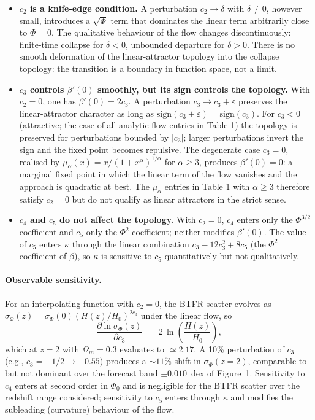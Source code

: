 \begin{itemize}
\item \textbf{$c_2$ is a knife-edge condition.} A perturbation $c_2 \to
\delta$ with $\delta \neq 0$, however small, introduces a $\sqrt{\Phi}$
term that dominates the linear term arbitrarily close to $\Phi = 0$. The
qualitative behaviour of the flow changes discontinuously: finite-time
collapse for $\delta < 0$, unbounded departure for $\delta > 0$. There is
no smooth deformation of the linear-attractor topology into the collapse
topology: the transition is a boundary in function space, not a limit.

\item \textbf{$c_3$ controls $\beta'(0)$ smoothly, but its sign controls
the topology.} With $c_2 = 0$, one has $\beta'(0) = 2c_3$. A perturbation
$c_3 \to c_3 + \varepsilon$ preserves the linear-attractor character as
long as $\mathrm{sign}(c_3 + \varepsilon) = \mathrm{sign}(c_3)$. For
$c_3 < 0$ (attractive; the case of all analytic-flow entries in Table 1)
the topology is preserved for perturbations bounded by $|c_3|$; larger
perturbations invert the sign and the fixed point becomes repulsive. The
degenerate case $c_3 = 0$, realised by $\mu_\alpha(x) = x/(1+x^\alpha)^{1/\alpha}$
for $\alpha \geq 3$, produces $\beta'(0) = 0$: a marginal fixed point in
which the linear term of the flow vanishes and the approach is
quadratic at best. The $\mu_\alpha$ entries in Table 1 with $\alpha \geq 3$
therefore satisfy $c_2 = 0$ but do not qualify as linear attractors in
the strict sense.

\item \textbf{$c_4$ and $c_5$ do not affect the topology.} With $c_2 = 0$,
$c_4$ enters only the $\Phi^{3/2}$ coefficient and $c_5$ only the
$\Phi^2$ coefficient; neither modifies $\beta'(0)$. The value of $c_5$
enters $\kappa$ through the linear combination $c_3 - 12c_3^2 + 8c_5$
(the $\Phi^2$ coefficient of $\beta$), so $\kappa$ is sensitive to $c_5$
quantitatively but not qualitatively.
\end{itemize}

\paragraph{Observable sensitivity.} For an interpolating function with
$c_2 = 0$, the BTFR scatter evolves as $\sigma_\Phi(z) = \sigma_\Phi(0)
(H(z)/H_0)^{2c_3}$ under the linear flow, so
\begin{equation}
\frac{\partial \ln \sigma_\Phi(z)}{\partial c_3}
\;=\; 2\,\ln\!\left(\frac{H(z)}{H_0}\right),
\label{eq:sens-c3}
\end{equation}
which at $z = 2$ with $\Omega_m = 0.3$ evaluates to $\simeq 2.17$. A 10\%
perturbation of $c_3$ (e.g., $c_3 = -1/2 \to -0.55$) produces a $\sim 11\%$
shift in $\sigma_\Phi(z = 2)$, comparable to but not dominant over the
forecast band $\pm 0.010$~dex of Figure~1. Sensitivity to $c_4$ enters at
second order in $\Phi_0$ and is negligible for the BTFR scatter over
the redshift range considered; sensitivity to $c_5$ enters through
$\kappa$ and modifies the subleading (curvature) behaviour of the flow.

